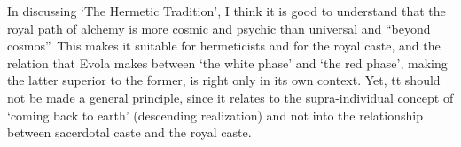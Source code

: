 \begin{footnotesize}
\begin{sffamily}
In discussing `The Hermetic Tradition', I think it is good to understand that the royal path of alchemy is more cosmic and psychic than universal and ``beyond cosmos''. This makes it suitable for hermeticists and for the royal caste, and the relation that Evola makes between `the white phase' and `the red phase', making the latter superior to the former, is right only in its own context. Yet, tt should not be made a general principle, since it relates to the supra-individual concept of `coming back to earth' (descending realization) and not into the relationship between sacerdotal caste and the royal caste.

\hfill

\end{sffamily}
\end{footnotesize}

